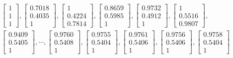 \documentclass[10pt]{article}
\begin{document}
\begin{CJK*}{UTF8}{bsmi}
$$
\begin{aligned}
& {\left[\begin{array}{l}
1 \\
1 \\
1
\end{array}\right],\left[\begin{array}{l}
0.7018 \\
0.4035 \\
1
\end{array}\right],\left[\begin{array}{l}
1 \\
0.4224 \\
0.7814
\end{array}\right],\left[\begin{array}{l}
0.8659 \\
0.5985 \\
1
\end{array}\right],\left[\begin{array}{l}
0.9732 \\
0.4912 \\
1
\end{array}\right],\left[\begin{array}{l}
1 \\
0.5516 \\
0.9807
\end{array}\right],} \\
& {\left[\begin{array}{l}
0.9409 \\
0.5405 \\
1
\end{array}\right], \cdots,\left[\begin{array}{l}
0.9760 \\
0.5408 \\
1
\end{array}\right],\left[\begin{array}{l}
0.9755 \\
0.5404 \\
1
\end{array}\right],\left[\begin{array}{l}
0.9761 \\
0.5406 \\
1
\end{array}\right],\left[\begin{array}{l}
0.9756 \\
0.5406 \\
1
\end{array}\right],\left[\begin{array}{l}
0.9758 \\
0.5404 \\
1
\end{array}\right]}
\end{aligned}
$$


\end{CJK*}
\end{document}

